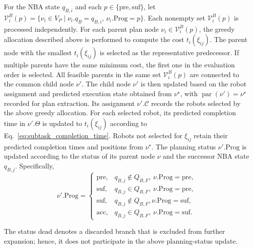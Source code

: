 \documentclass[lettersize,journal]{IEEEtran}
\theoremstyle{italiclemma}
\theoremstyle{italiclemma}
\theoremstyle{definition}
\begin{document}
For the NBA state $q_{B,i}$ and each $p\in\{\mathrm{pre},\mathrm{suf}\}$, let $\mathcal V_i^B(p)=\{\nu_i\in V_P\mid
\nu_i.q_B=q_{B,i},\,\nu_i.\mathrm{Prog}=p\}$. Each nonempty set $\mathcal V_i^B(p)$ is processed independently.  For each parent plan node $\nu_i\in\mathcal V_i^B(p)$, the greedy allocation described above is performed to compute the  cost $t_i(\xi_{ij})$. The  parent node with the smallest $t_i(\xi_{ij})$ is selected as the representative predecessor. If multiple parents have the same minimum cost, the first one in the evaluation order is selected. All feasible parents in the same set $\mathcal V_i^B(p)$ are connected to the common child node $\nu'$.
The child node $\nu'$ is then updated based on the robot assignment and predicted execution state obtained from $\nu^\star$, with $\operatorname{par}(\nu')=\nu^\star$ recorded for plan extraction.  Its assignment $\nu'.\mathcal C$ records the robots selected by the above greedy allocation. For each selected robot, its predicted completion time in $\nu'.\Theta$ is updated to $t_i(\xi_{ij})$ according to Eq.~\eqref{eq:subtask_completion_time}.
Robots not selected for $\xi_{ij}$ retain their predicted completion times and positions from $\nu^\star$. 
The planning status $\nu'.\mathrm{Prog}$ is updated according to the status of its parent node $\nu$ and the successor NBA state $q_{B,j}$. Specifically,
\begin{equation}
\nu'.\mathrm{Prog}
=
\begin{cases}
\mathrm{pre},
& q_{B,j}\notin Q_{B,F},\ \nu.\mathrm{Prog}=\mathrm{pre},\\
\mathrm{suf},
& q_{B,j}\in Q_{B,F},\ \nu.\mathrm{Prog}=\mathrm{pre},\\
\mathrm{suf},
& q_{B,j}\notin Q_{B,F},\nu. \mathrm{Prog}=\mathrm{suf},\\
\mathrm{acc},
& q_{B,j}\in Q_{B,F},\ \nu.\mathrm{Prog}=\mathrm{suf}.
\end{cases}
\end{equation}

The status $\mathrm{dead}$ denotes a discarded branch that is excluded from further expansion; hence, it does not participate in the above planning-status update.







\end{document}
